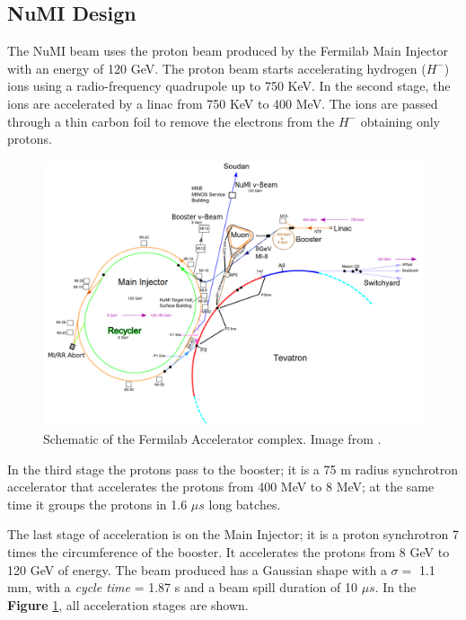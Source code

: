 \subsection{NuMI Design}

The NuMI beam uses the proton beam produced by the Fermilab Main Injector with an energy of 120 GeV. The proton beam starts accelerating hydrogen ($H^-$) ions using a radio-frequency quadrupole up to 750 KeV. In the second stage, the ions are accelerated by a linac from 750 KeV to 400 MeV. The ions are passed through a thin carbon foil to remove the electrons from the $H^-$ obtaining only protons. 

\begin{figure}[!htb]
\centering
\includegraphics[scale=0.29]{Figures/Chapter2/AcceleratorComplex.png}
        \caption{Schematic of the Fermilab Accelerator complex. Image from \cite{Numi}.} 
\label{fig:MnvExp:NuMI:SchematicMainInjector}
\end{figure}

In the third stage the protons pass to the booster; it is a 75 m radius synchrotron accelerator that accelerates the protons from 400 MeV to 8 MeV; at the same time it groups the protons in 1.6 $\mu s$ long batches. 

The last stage of acceleration is on the Main Injector; it is a proton synchrotron 7 times the circumference of the booster. It accelerates the protons from 8 GeV to 120 GeV of energy. The beam produced has a Gaussian shape with a $\sigma =$ 1.1 mm, with a \textit{ cycle time} = 1.87 s and a beam spill duration of 10 $\mu s$. In the  \textbf{Figure} \ref{fig:MnvExp:NuMI:SchematicMainInjector}, all acceleration stages are shown.

